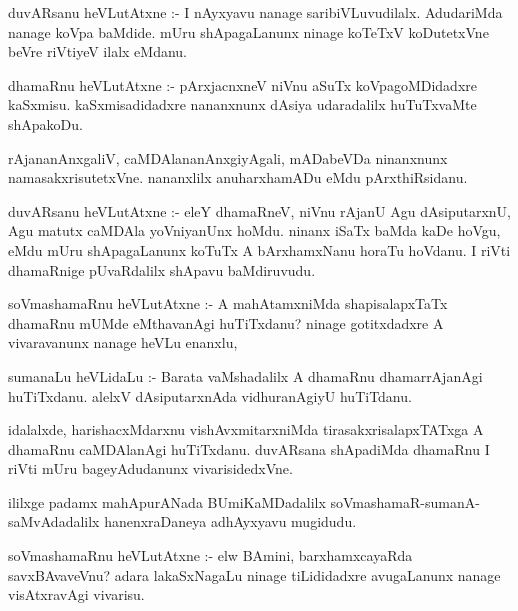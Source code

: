 \documentclass{article}
\begin{document}
\begin{mn}
duvARsanu heVLutAtxne :- I nAyxyavu nanage saribiVLuvudilalx. AdudariMda nanage 
koVpa baMdide. mUru shApagaLanunx ninage koTeTxV koDutetxVne beVre riVtiyeV ilalx eMdanu. 
\end{mn}

\begin{mn}
dhamaRnu heVLutAtxne :- pArxjacnxneV niVnu aSuTx koVpagoMDidadxre kaSxmisu. 
kaSxmisadidadxre nananxnunx dAsiya udaradalilx huTuTxvaMte shApakoDu.
\end{mn}

\begin{mn}
rAjananAnxgaliV, caMDAlananAnxgiyAgali, mADabeVDa ninanxnunx 
namasakxrisutetxVne. nananxlilx anuharxhamADu eMdu pArxthiRsidanu.
\end{mn}

\begin{mn}
duvARsanu heVLutAtxne :- eleY dhamaRneV, niVnu rAjanU Agu dAsiputarxnU, 
Agu matutx caMDAla yoVniyanUnx hoMdu. ninanx iSaTx baMda kaDe hoVgu, eMdu 
mUru shApagaLanunx koTuTx A bArxhamxNanu horaTu hoVdanu. I riVti dhamaRnige 
pUvaRdalilx shApavu baMdiruvudu.
\end{mn}

\begin{mn}
soVmashamaRnu heVLutAtxne :- A mahAtamxniMda shapisalapxTaTx dhamaRnu mUMde 
eMthavanAgi huTiTxdanu? ninage gotitxdadxre A vivaravanunx nanage heVLu enanxlu,
\end{mn}

\begin{mn}
sumanaLu heVLidaLu :- Barata vaMshadalilx A dhamaRnu dhamarrAjanAgi huTiTxdanu. 
alelxV dAsiputarxnAda vidhuranAgiyU huTiTdanu.
\end{mn}

\begin{mn}
idalalxde, harishacxMdarxnu vishAvxmitarxniMda tirasakxrisalapxTATxga A 
dhamaRnu caMDAlanAgi huTiTxdanu. duvARsana shApadiMda dhamaRnu I riVti mUru 
bageyAdudanunx vivarisidedxVne.
\end{mn}

\begin{mn}
ililxge padamx mahApurANada BUmiKaMDadalilx soVmashamaR-sumanA-saMvAdadalilx
hanenxraDaneya adhAyxyavu mugidudu.
\end{mn}


\begin{mn}
soVmashamaRnu heVLutAtxne :- elw BAmini,  barxhamxcayaRda savxBAvaveVnu? 
adara lakaSxNagaLu ninage tiLididadxre avugaLanunx nanage visAtxravAgi vivarisu. 
\end{mn}
\end{document}
